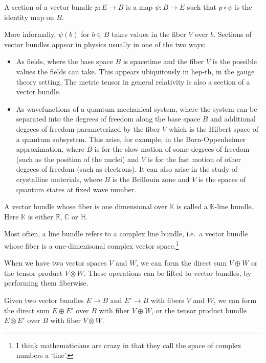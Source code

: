 \documentclass[12pt]{article}
\numberwithin{equation}{section}
\numberwithin{figure}{section}
\theoremstyle{remark}
\def\bC{\mathbb{C}}
\def\bH{\mathbb{H}}
\def\bK{\mathbb{K}}
\def\bR{\mathbb{R}}
\begin{document}
\begin{definition}
  A section of a vector bundle $p:E\to B$ is a map $\psi: B\to E$ such that $p\circ \psi $ is the identity map on $B$.
\end{definition}
More informally, $\psi(b)$ for $b\in B$ takes values in the fiber $V$ over $b$.
Sections of vector bundles appear in physics usually in one of the two ways:
\begin{itemize}
  \item As fields, where the base space $B$ is spacetime and 
  the fiber $V$ is the possible values the fields can take.
  This appears ubiquitously in hep-th, in the gauge theory setting.
  The metric tensor in general relativity is also a section of a vector bundle.
  \item As wavefunctions of a quantum mechanical system, 
  where the system can be separated 
  into the degrees of freedom along the base space $B$
  and additional degrees of freedom parameterized by the fiber $V$ 
  which is the Hilbert space of a quantum subsystem.
  This arise, for example, in the Born-Oppenheimer approximation,
  where $B$ is for the slow motion of some degrees of freedom (such as the position of the nuclei) and 
  $V$ is for the fast motion of other degrees of freedom (such as electrons).
  It can also arise in the study of crystalline materials,
  where $B$ is the Brillouin zone and $V$ is the spaces of quantum states at fixed wave number.
\end{itemize}

\begin{definition}
A vector bundle whose fiber is one dimensional over $\bK$ is called a 
$\bK$-line bundle.
Here $\bK$ is either $\bR$, $\bC$ or $\bH$.
\end{definition}
Most often, a line bundle refers to a complex line bundle, i.e.~a vector bundle
whose fiber is a one-dimenisonal complex vector space.\footnote{%
I think mathematicians are crazy in that they call the space of complex numbers a `line'.
}

When we have two vector spaces $V$ and $W$,
we can form the direct sum $V\oplus W$ or the tensor product $V\otimes W$.
These operations can be lifted to vector bundles,
by performing them fiberwise.
\begin{definition}
  Given two vector bundles $E\to B$ and $E'\to B$ with fibers $V$ and $W$,
  we can form the direct sum $E\oplus E'$ over $B$ with fiber $V\oplus W$,
  or the tensor product bundle $E\otimes E'$ over $B$ with fiber $V\otimes W$.  
\end{definition}
\end{document}
